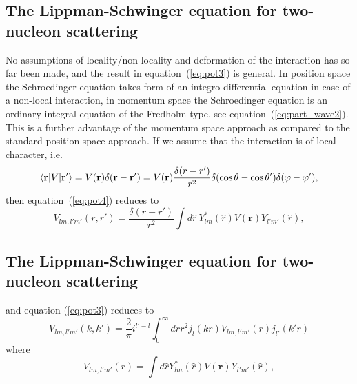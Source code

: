 \documentclass[%
twoside,                 %
final,                   %
10pt]{article}
\begin{document}
\subsection{The Lippman-Schwinger equation for two-nucleon scattering}
\begin{block}{}
No assumptions of locality/non-locality and deformation of the interaction has so far been made, 
and the result in equation~(\ref{eq:pot3}) is general. In position space the Schroedinger equation 
takes form of an integro-differential equation in case of a non-local interaction, 
in momentum space the Schroedinger equation is an ordinary integral equation of the Fredholm type, 
see equation~(\ref{eq:part_wave2}). This is a further advantage of the momentum space approach as compared to 
the standard position space approach.  
If we assume that the 
interaction is of local character, i.e. 
\[
  \langle \mathbf{r}\vert V \vert \mathbf{r'}\rangle = V(\mathbf{r}) \delta( \mathbf{r}-\mathbf{r}' ) = 
  V(\mathbf{r}) {\delta( { r}-{r}' ) \over r^2} \delta ( \cos \theta - \cos \theta' ) \delta (\varphi-\varphi'), 
\]
then equation~(\ref{eq:pot4}) reduces to 
\begin{equation}
  V_{lm, l'm'}(r,r') = \frac{\delta({r}-{r}')}{r^2}\int d{\hat{r}}\:
  Y_{lm}^*(\hat{r})V(\mathbf{r})Y_{l'm'}(\hat{r}),
  \label{eq:pot5}
\end{equation}
\end{block}

\subsection{The Lippman-Schwinger equation for two-nucleon scattering}
\begin{block}{}
and equation (\ref{eq:pot3}) reduces to  
\begin{equation}
  V_{lm, l'm'}(k,k') = \frac{2}{\pi}i^{l' -l}\int_0^\infty drr^2j_l(kr) V_{lm,l'm'}(r) j_{l'}(k'r)
  \label{eq:pot6}
\end{equation}
where 
\begin{equation}
  V_{lm, l'm'}(r) = \int d{\hat{r}}Y_{lm}^*(\hat{r})V(\mathbf{r})Y_{l'm'}(\hat{r}),
  \label{eq:pot10}
\end{equation}
\end{block}

\end{document}
